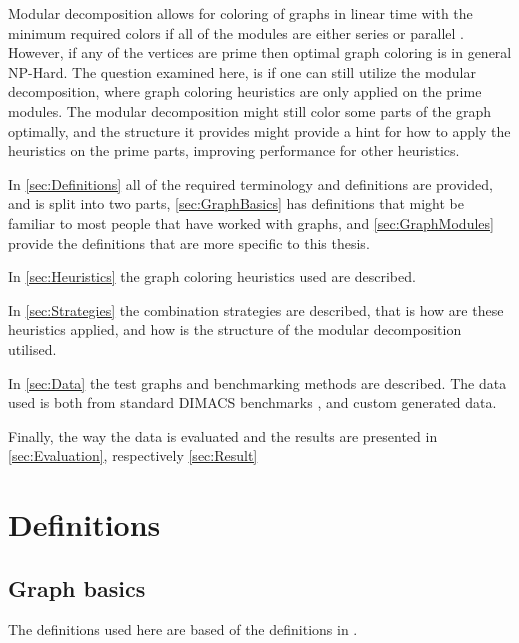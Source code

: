\documentclass[a4paper]{article}
\begin{document}
Modular decomposition allows for coloring of graphs in linear time with the
minimum required colors if all of the modules are either  series or parallel
\cite{HCL}. However, if any of the vertices are prime then optimal graph
coloring is in general NP-Hard\cite{NPHard}. The question examined here, is if
one can still utilize the modular decomposition, where graph coloring
heuristics are only applied on the prime modules. The modular decomposition
might still color some parts of the graph optimally, and the structure it
provides might provide a hint for how to apply the heuristics on the prime
parts, improving performance for other heuristics.

In \autoref{sec:Definitions} all of the required terminology and definitions are
provided, and is split into two parts, \autoref{sec:GraphBasics} has definitions that might be
familiar to most people that have worked with graphs, and
\autoref{sec:GraphModules} provide the definitions that are more specific to
this thesis.

In \autoref{sec:Heuristics} the graph coloring heuristics used are described.

In \autoref{sec:Strategies} the combination strategies are described, that is how are
these heuristics applied, and how is the structure of the modular decomposition
utilised.

In \autoref{sec:Data} the test graphs and benchmarking methods are described. The data
used is both from standard DIMACS benchmarks \cite{DIMACS}, and custom generated data.

Finally, the way the data is evaluated and the results are presented in 
\autoref{sec:Evaluation}, respectively \autoref{sec:Result}

\section{Definitions}
\label{sec:Definitions}

\subsection{Graph basics}
\label{sec:GraphBasics}

The definitions used here are based of the definitions in \cite{GraphBasics}. 
\end{document}
